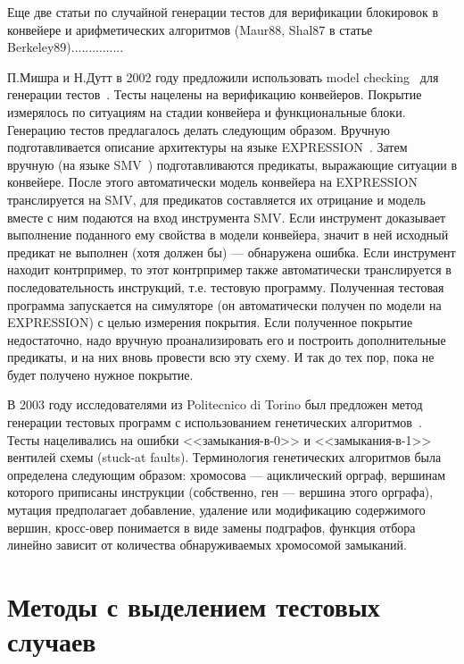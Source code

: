 \documentclass[14pt]{extreport}
\begin{document}
Еще две статьи по случайной генерации тестов для верификации блокировок в конвейере и арифметических алгоритмов (Maur88, Shal87 в статье Berkeley89)...............

П.Мишра и Н.Дутт в 2002 году предложили использовать model checking~\cite{ModelChecking} для генерации тестов~\cite{MishraDutt02}. Тесты нацелены на верификацию конвейеров. Покрытие измерялось по ситуациям на стадии конвейера и функциональные блоки. Генерацию тестов предлагалось делать следующим образом. Вручную подготавливается описание архитектуры на языке EXPRESSION~\cite{EXPRESSION}. Затем вручную (на языке SMV~\cite{SMV}) подготавливаются предикаты, выражающие ситуации в конвейере. После этого автоматически модель конвейера на EXPRESSION транслируется на SMV, для предикатов составляется их отрицание и модель вместе с ним подаются на вход инструмента SMV. Если инструмент доказывает выполнение поданного ему свойства в модели конвейера, значит в ней исходный предикат не выполнен (хотя должен бы) --- обнаружена ошибка. Если инструмент находит контрпример, то этот контрпример также автоматически транслируется в последовательность инструкций, т.е. тестовую программу. Полученная тестовая программа запускается на симуляторе (он автоматически получен по модели на EXPRESSION) с целью измерения покрытия. Если полученное покрытие недостаточно, надо вручную проанализировать его и построить дополнительные предикаты, и на них вновь провести всю эту схему. И так до тех пор, пока не будет получено нужное покрытие.

В 2003 году исследователями из Politecnico di Torino был предложен метод генерации тестовых программ с использованием генетических алгоритмов~\cite{microGP}. Тесты нацеливались на ошибки <<замыкания-в-0>> и <<замыкания-в-1>> вентилей схемы (stuck-at faults). Терминология генетических алгоритмов была определена следующим образом: хромосова --- ациклический орграф, вершинам которого приписаны инструкции (собственно, ген --- вершина этого орграфа), мутация предполагает добавление, удаление или модификацию содержимого вершин, кросс-овер понимается в виде замены подграфов, функция отбора линейно зависит от количества обнаруживаемых хромосомой замыканий.

\section{Методы с выделением тестовых случаев}
\end{document}
